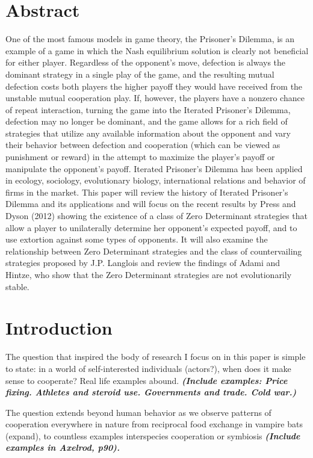 \chapter{Abstract}
One of the most famous models in game theory, the Prisoner's Dilemma, is an example of a game in which the Nash equilibrium solution is clearly not beneficial for either player. Regardless of the opponent's move, defection is always the dominant strategy in a single play of the game, and the resulting mutual defection costs both players the higher payoff they would have received from the unstable mutual cooperation play. If, however, the players have a nonzero chance of repeat interaction, turning the game into the Iterated Prisoner's Dilemma, defection may no longer be dominant, and the game allows for a rich field of strategies that utilize any available information about the opponent and vary their behavior between defection and cooperation (which can be viewed as punishment or reward) in the attempt to maximize the player's payoff or manipulate the opponent's payoff. Iterated Prisoner's Dilemma has been applied in ecology, sociology, evolutionary biology, international relations and behavior of firms in the market. This paper will review the history of Iterated Prisoner's Dilemma and its applications and will focus on the recent results by Press and Dyson (2012) showing the existence of a class of Zero Determinant strategies that allow a player to unilaterally determine her opponent's expected payoff, and to use extortion against some types of opponents. It will also examine the relationship between Zero Determinant strategies and the class of countervailing strategies proposed by J.P. Langlois and review the findings of Adami and Hintze, who show that the Zero Determinant strategies are not evolutionarily stable.

\chapter{Introduction}

The question that inspired the body of research I focus on in this paper is simple to state: in a world of self-interested individuals (actors?), when does it make sense to cooperate?  Real life examples abound. \textit{\textbf{(Include examples: Price fixing. Athletes and steroid use. Governments and trade. Cold war.)}}

The question extends beyond human behavior as we observe patterns of cooperation everywhere in nature from reciprocal food exchange in vampire bats (expand), to countless examples interspecies cooperation or symbiosis \textit{\textbf{(Include examples in Axelrod, p90).}}

